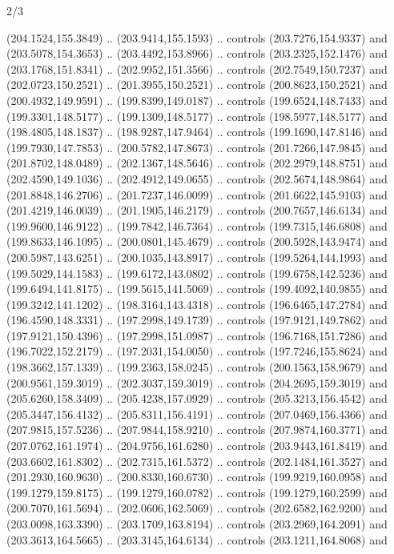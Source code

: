 \begin{flagdescription}{2/3}
\begin{scope}[xshift=0.5\flaglength,yshift=0.5\flagwidth,scale=\flagwidth/180]
\begin{scope}[y=0.8pt, x=0.8pt, yscale=-1,shift={(-168.75,-108.75)}]
  (204.1524,155.3849) .. (203.9414,155.1593) .. controls (203.7276,154.9337) and
  (203.5078,154.3653) .. (203.4492,153.8966) .. controls (203.2325,152.1476) and
  (203.1768,151.8341) .. (202.9952,151.3566) .. controls (202.7549,150.7237) and
  (202.0723,150.2521) .. (201.3955,150.2521) .. controls (200.8623,150.2521) and
  (200.4932,149.9591) .. (199.8399,149.0187) .. controls (199.6524,148.7433) and
  (199.3301,148.5177) .. (199.1309,148.5177) .. controls (198.5977,148.5177) and
  (198.4805,148.1837) .. (198.9287,147.9464) .. controls (199.1690,147.8146) and
  (199.7930,147.7853) .. (200.5782,147.8673) .. controls (201.7266,147.9845) and
  (201.8702,148.0489) .. (202.1367,148.5646) .. controls (202.2979,148.8751) and
  (202.4590,149.1036) .. (202.4912,149.0655) .. controls (202.5674,148.9864) and
  (201.8848,146.2706) .. (201.7237,146.0099) .. controls (201.6622,145.9103) and
  (201.4219,146.0039) .. (201.1905,146.2179) .. controls (200.7657,146.6134) and
  (199.9600,146.9122) .. (199.7842,146.7364) .. controls (199.7315,146.6808) and
  (199.8633,146.1095) .. (200.0801,145.4679) .. controls (200.5928,143.9474) and
  (200.5987,143.6251) .. (200.1035,143.8917) .. controls (199.5264,144.1993) and
  (199.5029,144.1583) .. (199.6172,143.0802) .. controls (199.6758,142.5236) and
  (199.6494,141.8175) .. (199.5615,141.5069) .. controls (199.4092,140.9855) and
  (199.3242,141.1202) .. (198.3164,143.4318) .. controls (196.6465,147.2784) and
  (196.4590,148.3331) .. (197.2998,149.1739) .. controls (197.9121,149.7862) and
  (197.9121,150.4396) .. (197.2998,151.0987) .. controls (196.7168,151.7286) and
  (196.7022,152.2179) .. (197.2031,154.0050) .. controls (197.7246,155.8624) and
  (198.3662,157.1339) .. (199.2363,158.0245) .. controls (200.1563,158.9679) and
  (200.9561,159.3019) .. (202.3037,159.3019) .. controls (204.2695,159.3019) and
  (205.6260,158.3409) .. (205.4238,157.0929) .. controls (205.3213,156.4542) and
  (205.3447,156.4132) .. (205.8311,156.4191) .. controls (207.0469,156.4366) and
  (207.9815,157.5236) .. (207.9844,158.9210) .. controls (207.9874,160.3771) and
  (207.0762,161.1974) .. (204.9756,161.6280) .. controls (203.9443,161.8419) and
  (203.6602,161.8302) .. (202.7315,161.5372) .. controls (202.1484,161.3527) and
  (201.2930,160.9630) .. (200.8330,160.6730) .. controls (199.9219,160.0958) and
  (199.1279,159.8175) .. (199.1279,160.0782) .. controls (199.1279,160.2599) and
  (200.7070,161.5694) .. (202.0606,162.5069) .. controls (202.6582,162.9200) and
  (203.0098,163.3390) .. (203.1709,163.8194) .. controls (203.2969,164.2091) and
  (203.3613,164.5665) .. (203.3145,164.6134) .. controls (203.1211,164.8068) and

\end{scope}
\end{scope}
\end{flagdescription}

